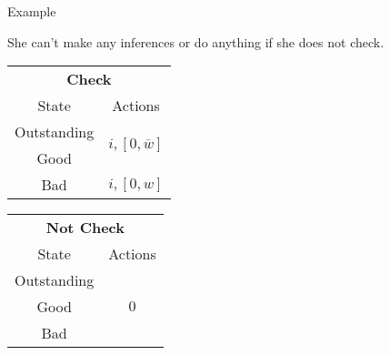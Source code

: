 \documentclass[usenames,dvipsnames,aspectratio=169,11pt, envcountsect]{beamer}
\begin{document}
\begin{frame}[noframenumbering]{Example}

	She can't make any inferences or do anything if she does not check.

	\vfill

	\begin{table}[H]
		\centering
		\begin{minipage}{0.29\textwidth}

		\end{minipage}\hspace{0.3cm} %
		\begin{minipage}{0.29\textwidth}
			\centering
			\begin{tabular}{c | c}
				\multicolumn{2}{c}{\textbf{Check}}                                                                                 \\
				State                             & Actions                                                                        \\
				\hline
				{\color{bleudefrance}Outstanding} & \multirow{2}{*}{{\color{bleudefrance}\( i, \left[ 0, \overline{w} \right] \)}} \\
				{\color{bleudefrance}Good}        &                                                                                \\
				Bad                               & \(  i, \left[0, w \right] \)                                                   \\
			\end{tabular}
			\vspace{0.5cm} %
		\end{minipage}\hspace{0.7cm} %
		\begin{minipage}{0.29\textwidth}
			\centering
			\begin{tabular}{c | c}
				\multicolumn{2}{c}{\textbf{Not Check}}  \\
				State       & Actions                   \\
				\hline
				Outstanding & \multirow{3}{*}{ \( 0 \)} \\
				Good        &                           \\
				Bad         &                           \\
			\end{tabular}
			\vspace{0.5cm} %
		\end{minipage}
	\end{table}

\end{frame}
\end{document}
